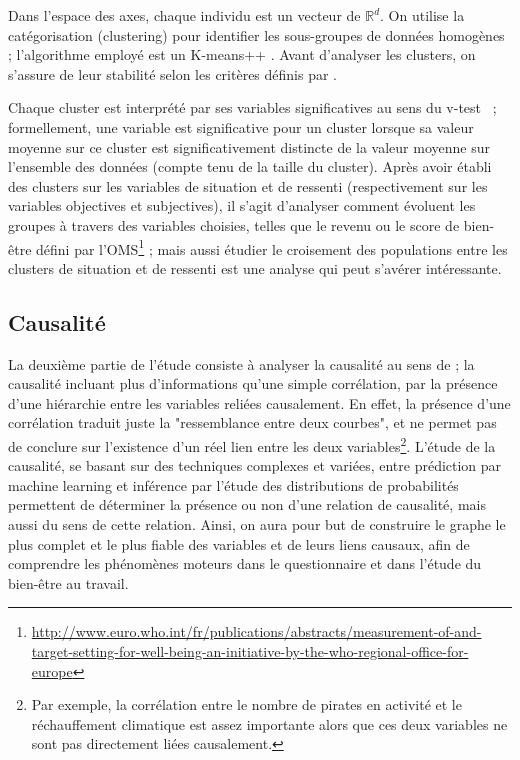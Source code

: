 \documentclass[11pt,fleqn,a4paper,openany,frenchb]{book} %
\begin{document}
Dans l'espace des axes, chaque individu est un vecteur de $\mathbb{R}^d$. On utilise la catégorisation (clustering) pour identifier les sous-groupes de données homogènes ; l'algorithme employé est un K-means++ \cite{arthur2007k}. Avant d'analyser les clusters, on s'assure de leur stabilité selon les critères définis par \cite{meilua2006uniqueness}. \par

Chaque cluster est interprété par ses variables significatives au sens du v-test \cite{lebart2006statistique}~; formellement, une variable est significative pour un cluster lorsque sa valeur moyenne sur ce cluster est significativement distincte de la valeur moyenne sur l'ensemble des données (compte tenu de la taille du cluster). Après avoir établi des clusters sur les variables de  situation et de ressenti (respectivement sur les variables objectives et subjectives), il s'agit d'analyser comment évoluent les groupes à travers des variables choisies, telles que le revenu ou le score de bien-être défini par l'OMS\footnote{\url{http://www.euro.who.int/fr/publications/abstracts/measurement-of-and-target-setting-for-well-being-an-initiative-by-the-who-regional-office-for-europe}} ; mais aussi étudier le croisement des populations entre les clusters de situation et de ressenti est une analyse qui peut s'avérer intéressante.\par

\subsection{Causalité}
La deuxième partie de l'étude consiste à analyser la causalité au sens de \cite{granger1969causality} ; la causalité incluant plus d'informations qu'une simple corrélation, par la présence d'une hiérarchie entre les variables reliées causalement. En effet, la présence d'une corrélation traduit juste la "ressemblance entre deux courbes", et ne permet pas de conclure sur l'existence d'un réel lien entre les deux variables\footnote{Par exemple, la corrélation entre le nombre de pirates en activité et le réchauffement climatique est assez importante alors que ces deux variables ne sont pas directement liées causalement.}. L'étude de la causalité, se basant sur des techniques complexes et variées, entre prédiction par machine learning et inférence par l'étude des distributions de probabilités permettent de déterminer la présence ou non d'une relation de causalité, mais aussi du sens de cette relation. Ainsi, on aura pour but de construire le graphe le plus complet et le plus fiable des variables et de leurs liens causaux, afin de comprendre les phénomènes moteurs dans le questionnaire et dans l'étude du bien-être au travail. \par %
\end{document}
